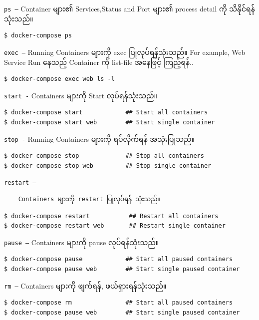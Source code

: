 \texttt{ps –} Container များ၏ Services,Status and Port များ၏ process
detail ကို သိနိုင်ရန် သုံးသည်။

\begin{verbatim}
$ docker-compose ps
\end{verbatim}

\texttt{exec –} Running Containers များကို exec ပြုလုပ်ရန်သုံးသည်။ For
example, Web Service Run နေသည့် Container ကို list-file အနေဖြင့်
ကြည့်ရန်..

\begin{verbatim}
$ docker-compose exec web ls -l
\end{verbatim}

\texttt{start -} Containers များကို Start လုပ်ရန်သုံးသည်။

\begin{verbatim}
$ docker-compose start            ## Start all containers
$ docker-compose start web        ## Start single container
\end{verbatim}

\texttt{stop -} Running Containers များကို ရပ်လိုက်ရန် အသုံးပြုသည်။

\begin{verbatim}
$ docker-compose stop             ## Stop all containers
$ docker-compose stop web         ## Stop single container
\end{verbatim}

\texttt{restart –}

\begin{verbatim}
    Containers များကို restart ပြုလုပ်ရန် သုံးသည်။
\end{verbatim}

\begin{verbatim}
$ docker-compose restart           ## Restart all containers
$ docker-compose restart web       ## Restart single container
\end{verbatim}

\texttt{pause –} Containers များကို pause လုပ်ရန်သုံးသည်။

\begin{verbatim}
$ docker-compose pause            ## Start all paused containers
$ docker-compose pause web        ## Start single paused container
\end{verbatim}

\texttt{rm –} Containers များကို ဖျက်ရန်, ဖယ်ရှားရန်သုံးသည်။

\begin{verbatim}
$ docker-compose rm               ## Start all paused containers
$ docker-compose pause web        ## Start single paused container
\end{verbatim}

